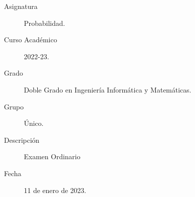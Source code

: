 \documentclass[12pt]{article}
\begin{document}

    
    

    \begin{description}
        \item[Asignatura] Probabilidad.
        \item[Curso Académico] 2022-23.
        \item[Grado] Doble Grado en Ingeniería Informática y Matemáticas.
        \item[Grupo] Único.
        \item[Descripción] Examen Ordinario 
        \item[Fecha] 11 de enero de 2023.
    
    \end{description}
    \newpage
\end{document}
